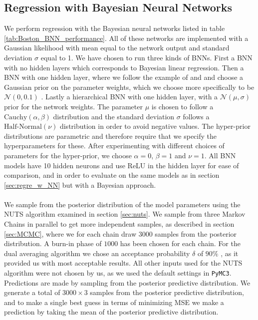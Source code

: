 \subsection{Regression with Bayesian Neural
Networks}\label{subsec:regression_w_bnn}
We perform regression with the Bayesian neural networks listed in table \ref{tab:Boston_BNN_performance}. All of these networks are implemented with a Gaussian likelihood with mean equal to the network output and standard deviation $\sigma$ equal to 1. We have chosen to run three kinds of BNNs. First a BNN with no hidden layers which corresponds to Bayesian linear regression. Then a BNN with one hidden layer, where we follow the example of \cite{mackay1991} and \cite{MacKay1992} and choose a Gaussian prior on the parameter weights, which we choose more specifically to be $\mathcal{N}(0,0.1)$ . Lastly a hierarchical BNN with one hidden layer, with a $\mathcal{N}(\mu,\sigma)$ prior for the network weights. The parameter $\mu$ is chosen to follow a $\text{Cauchy}(\alpha,\beta)$ distribution and the standard deviation $\sigma$ follows a $\text{Half-Normal}(\nu)$ distribution in order to avoid negative values. The hyper-prior distributions are parametric and therefore require that we specify the hyperparameters for these.
After experimenting with different choices of parameters for the hyper-prior, we choose $\alpha=0$, $\beta=1$ and $\nu=1$. All BNN models have 10 hidden neurons and use ReLU in the hidden layer for ease of comparison, and in order to evaluate on the same models as in section \ref{sec:regre_w_NN} but with a Bayesian approach. \\
\\
We sample from the posterior distribution of the model parameters using the NUTS algorithm examined in section \ref{sec:nuts}.
We sample from three Markov Chains in parallel to get more independent samples, as described in section \ref{sec:MCMC}, where we for each chain draw $3000$ samples from the posterior distribution. A burn-in phase of $1000$ has been chosen for each chain. For the dual averaging algorithm we chose an
acceptance probability $\delta$ of $90\%$ , as it provided us with most acceptable results. All other inputs used for the NUTS algorithm were not chosen by us, as we used the default settings in \texttt{PyMC3}. 
Predictions are made by sampling from the posterior predictive distribution. We generate a total of $3000 \times 3$ samples from the posterior predictive distribution, and to make a single best guess in terms of minimizing MSE we make a prediction by taking the mean of the posterior predictive distribution. 
